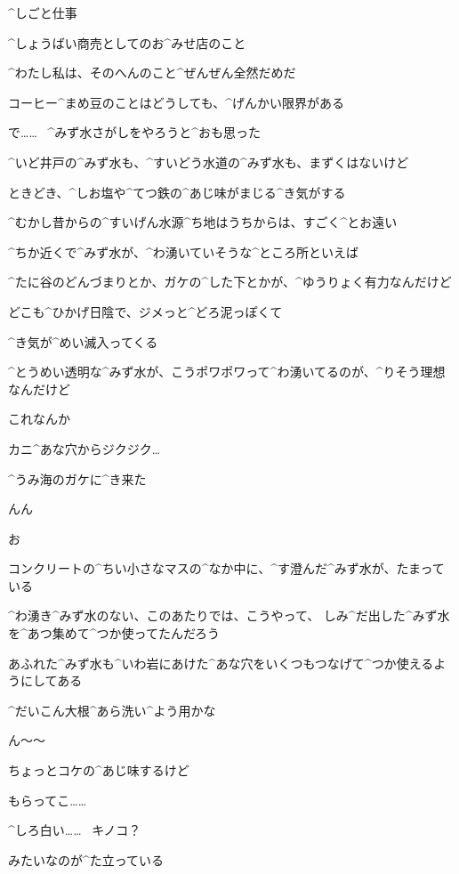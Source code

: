 \A ^{しごと}{仕事}

\A ^{しょうばい}{商売}としてのお^{みせ}{店}のこと

\A ^{わたし}{私}は、そのへんのこと^{ぜんぜん}{全然}だめだ

\page
\A コーヒー^{まめ}{豆}のことはどうしても、^{げんかい}{限界}がある

\A で……
\ ^{みず}{水}さがしをやろうと^{おも}{思}った

\A ^{いど}{井戸}の^{みず}{水}も、^{すいどう}{水道}の^{みず}{水}も、まずくはないけど

\A ときどき、^{しお}{塩}や^{てつ}{鉄}の^{あじ}{味}がまじる^{き}{気}がする

\page
\A ^{むかし}{昔}からの^{すいげん}{水源}^{ち}{地}はうちからは、すごく^{とお}{遠}い

\A ^{ちか}{近}くで^{みず}{水}が、^{わ}{湧}いていそうな^{ところ}{所}といえば

\A ^{たに}{谷}のどんづまりとか、ガケの^{した}{下}とかが、^{ゆうりょく}{有力}なんだけど

\page
\A どこも^{ひかげ}{日陰}で、ジメっと^{どろ}{泥}っぽくて

\A ^{き}{気}が^{めい}{滅入}ってくる

\A ^{とうめい}{透明}な^{みず}{水}が、こうポワポワって^{わ}{湧}いてるのが、^{りそう}{理想}なんだけど

\A これなんか

\A カニ^{あな}{穴}からジクジク…

\page
\A ^{うみ}{海}のガケに^{き}{来}た

\A んん

\A お

\page[49]
\A コンクリートの^{ちい}{小}さなマスの^{なか}{中}に、^{す}{澄}んだ^{みず}{水}が、たまっている

\A ^{わ}{湧}き^{みず}{水}のない、このあたりでは、こうやって、
しみ^{だ}{出}した^{みず}{水}を^{あつ}{集}めて^{つか}{使}ってたんだろう

\page
\A あふれた^{みず}{水}も^{いわ}{岩}にあけた^{あな}{穴}をいくつもつなげて^{つか}{使}えるようにしてある

\A ^{だいこん}{大根}^{あら}{洗}い^{よう}{用}かな

\page
\A ん〜〜

\A ちょっとコケの^{あじ}{味}するけど

\A もらってこ……

\page[53]
\A ^{しろ}{白}い……
\ キノコ？

\A みたいなのが^{た}{立}っている

